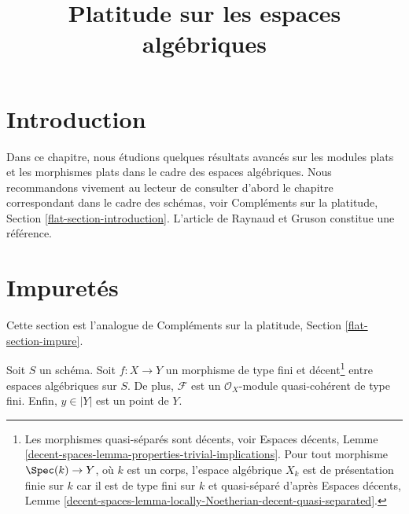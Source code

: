

%


\title{Platitude sur les espaces algébriques}

\maketitle

\label{section-phantom}

\tableofcontents



\section{Introduction}
\label{section-introduction}

\noindent
Dans ce chapitre, nous étudions quelques résultats avancés sur les modules plats et
les morphismes plats dans le cadre des espaces algébriques. Nous recommandons vivement
au lecteur de consulter d'abord le chapitre correspondant
dans le cadre des schémas, voir
Compléments sur la platitude, Section \ref{flat-section-introduction}.
L'article \cite{GruRay} de Raynaud et Gruson constitue une référence.







\section{Impuretés}
\label{section-impure}

\noindent
Cette section est l'analogue de
Compléments sur la platitude, Section \ref{flat-section-impure}.

\begin{situation}
\label{situation-pre-pure}
Soit $S$ un schéma. Soit $f : X \to Y$ un morphisme
de type fini et décent\footnote{Les morphismes quasi-séparés sont décents, voir
Espaces décents, Lemme
\ref{decent-spaces-lemma-properties-trivial-implications}.
Pour tout morphisme $\Spec(k) \to Y$, où $k$ est un corps,
l'espace algébrique $X_k$ est de présentation finie sur $k$
car il est de type fini sur $k$ et quasi-séparé d'après
Espaces décents, Lemme
\ref{decent-spaces-lemma-locally-Noetherian-decent-quasi-separated}.}
entre espaces algébriques sur $S$. De plus, $\mathcal{F}$ est un $\mathcal{O}_X$-module
quasi-cohérent de type fini. Enfin, $y \in |Y|$ est un point de $Y$.
\end{situation}

